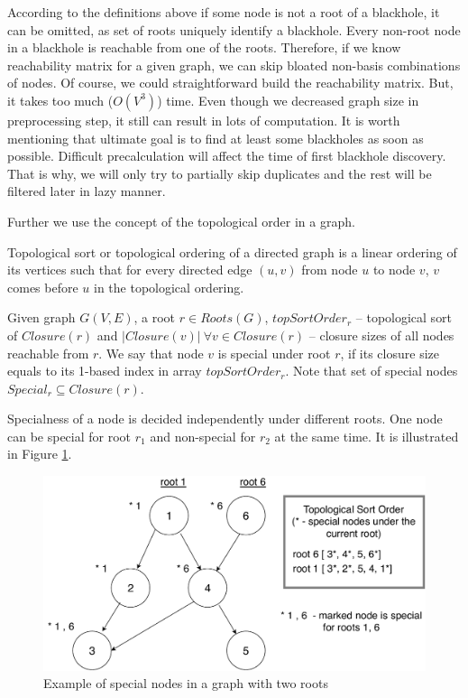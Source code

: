 \documentclass{svproc}
\begin{document}
According to the definitions above if some node is not a root of a blackhole, it can be omitted, as set of roots uniquely identify a blackhole.
Every non-root node in a blackhole is reachable from one of the roots. Therefore, if we know reachability matrix for a given graph, we can skip bloated non-basis combinations of nodes. Of course, we could straightforward build the reachability matrix. But, it takes too much ($O(V^3)$) time. Even though we decreased graph size
in preprocessing step, it still can result in lots of computation. It is worth mentioning that ultimate goal is to find at least some blackholes as soon as possible. 
Difficult precalculation will affect the time of first blackhole discovery. That is why, we will only try to partially skip duplicates and the rest will
be filtered later in lazy manner.

Further we use the concept of the topological order in a graph.  

\begin{definition}
	Topological sort or topological ordering of a directed graph is a linear ordering of 
	its vertices such that for every directed edge $(u,v)$ from node $u$ to node $v$,
	$v$ comes before $u$ in the topological ordering.
\end{definition}

\begin{definition}
	Given graph $G(V, E)$, a root $r \in Roots(G)$, $topSortOrder_r$ -- topological sort of $Closure(r)$ and 
	$|Closure(v)|\ \forall v \in Closure(r)$ --
	closure sizes of all nodes reachable from $r$. We say that node $v$ is special under root $r$, if its closure size  equals to its 1-based index in array $topSortOrder_r$. Note that set of special nodes $Special_r \subseteq Closure(r)$.
\end{definition}


\begin{remark}
    Specialness of a node is decided independently under different roots. One node can be special for root $r_1$ and non-special for $r_2$ at
    the same time. It is illustrated in Figure \ref{fig:specialnodes}.
\end{remark}

\begin{figure}[H]
	\includegraphics[width=\linewidth]{specialnodes.pdf}
	\caption{Example of special nodes in a graph with two roots}
	\label{fig:specialnodes}
\end{figure}
\end{document}

